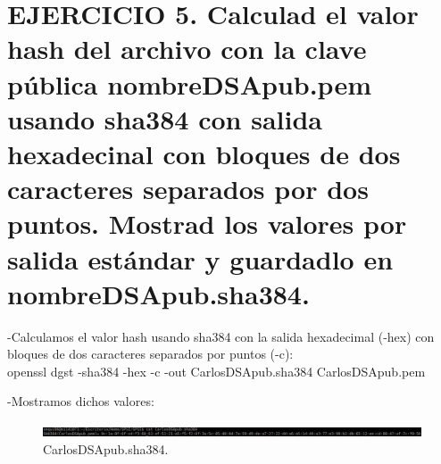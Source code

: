 







\section{EJERCICIO 5. Calculad el valor hash del archivo con la clave pública nombreDSApub.pem usando sha384 con salida hexadecinal con bloques de dos caracteres separados por dos puntos. Mostrad los valores por salida estándar y guardadlo en nombreDSApub.sha384.}

-Calculamos el valor hash usando sha384 con la salida hexadecimal (-hex) con bloques de dos caracteres separados por puntos (-c): \\

openssl dgst -sha384 -hex -c -out CarlosDSApub.sha384 CarlosDSApub.pem

-Mostramos dichos valores: \\

\begin{figure}[h]
	\centering
	\includegraphics[width=1.2\textwidth]{imagenes/CarlosDSApubsha384}
	\caption{CarlosDSApub.sha384.}
\end{figure}






